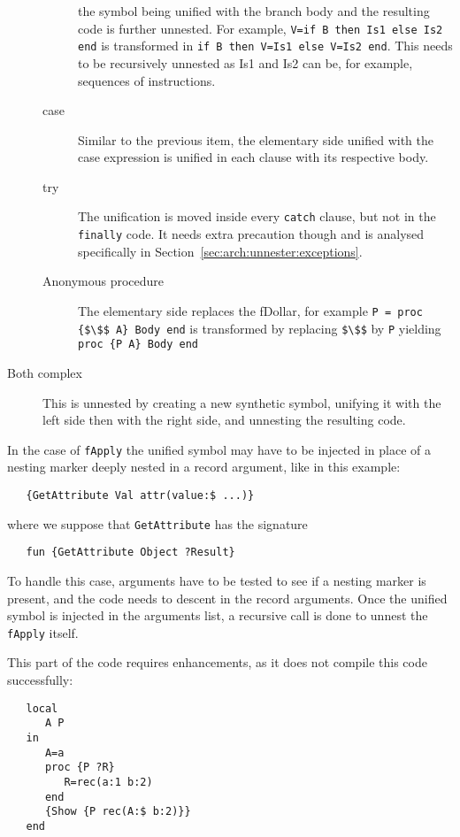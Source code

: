 \documentclass[a4paper]{memoir}
\begin{document}
\begin{description}
\begin{description}
        the symbol being unified with the branch body and the resulting code is further unnested. For example, \lstinline!V=if B then Is1 else Is2 end! is transformed in \lstinline!if B then V=Is1 else V=Is2 end!. This needs to be recursively unnested as Is1 and Is2 can be, for example,  sequences of instructions.
      \item[case] Similar to the previous item, the elementary side  unified with the case expression is unified in each
        clause with its respective body.
      \item[try] The unification is moved inside every \lstinline!catch! clause, but not in
        the \lstinline!finally! code. It needs extra precaution though and is analysed specifically in
        Section~\ref{sec:arch:unnester:exceptions}.
      \item[Anonymous procedure] The elementary side replaces the fDollar, for
        example
        \lstinline[mathescape]!P = proc {$\$$ A} Body end! is transformed by replacing \lstinline[mathescape]{$\$$} by \lstinline!P! yielding
        \lstinline[mathescape]!proc {P A} Body end!
    \end{description}
  \item[Both complex] This is unnested by creating a new synthetic symbol, unifying it with the left side then with the right side, and unnesting the resulting code.
\end{description}

In the case of \lstinline!fApply! the unified
symbol may have to be injected in place of a nesting marker deeply nested in
a record argument, like in this example:

\begin{lstlisting}
   {GetAttribute Val attr(value:$ ...)}
\end{lstlisting}

where we suppose that \lstinline!GetAttribute! has the signature 
\begin{lstlisting}
   fun {GetAttribute Object ?Result}
\end{lstlisting}
To handle this case, arguments have to be tested to see if a nesting marker is
present, and the code needs to descent in the record arguments.
Once the unified symbol is injected in the arguments list, a recursive call is
done to unnest the \lstinline!fApply! itself.

This part of the code requires enhancements, as it does not compile this code successfully:

\begin{lstlisting}
   local
      A P
   in
      A=a
      proc {P ?R}
         R=rec(a:1 b:2)
      end
      {Show {P rec(A:$ b:2)}}
   end
\end{lstlisting}
\end{document}
